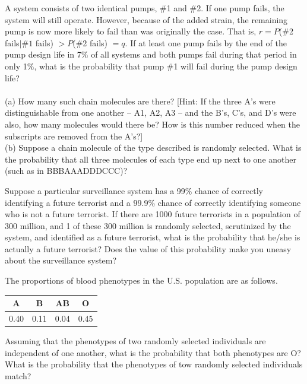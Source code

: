 \documentclass[12pt,letterpaper]{hmcpset}
\begin{document}
\begin{problem}[2.4.52]
A system consists of two identical pumps, $\#$1 and $\#$2. If one pump fails, the system will still operate. However, because of the added strain, the remaining pump is now more likely to fail than was originally the case. That is, $r = P$($\#$2 fails$|\#1$ fails) $> P$($\#$2 fails) $= q$. If at least one pump fails by the end of the pump design life in 7$\%$ of all systems and both pumps fail during that period in only 1$\%$, what is the probability that pump $\#$1 will fail during the pump design life?
\\ \\
(a) How many such chain molecules are there? [Hint: If the three A’s were distinguishable from one another – A1, A2, A3 – and the B’s, C’s, and D’s were also, how many molecules would there be? How is this number reduced when the subscripts are removed from the A’s?]
\\
(b) Suppose a chain molecule of the type described is randomly selected. What is the probability that all three molecules of each type end up next to one another (such as in BBBAAADDDCCC)?

\end{problem}

\begin{solution}

\end{solution}
\newpage

\begin{problem}[2.4.67]
Suppose a particular surveillance system has a 99$\%$ chance of correctly identifying a future terrorist and a 99.9$\%$ chance of correctly identifying someone who is not a future terrorist. If there are 1000 future terrorists in a population of 300 million, and 1 of these 300 million is randomly selected, scrutinized by the system, and identified as a future terrorist, what is the probability that he/she is actually a future terrorist? Does the value of this probability make you uneasy about the surveillance system?

\end{problem}

\begin{solution}

\end{solution}
\newpage

\begin{problem}[2.5.74]
The proportions of blood phenotypes in the U.S. population are as follows.\\
\begin{center}
	\begin{tabular}{c|c|c|c}
 		A & B & AB & O \\
 		\hline
 		0.40 & 0.11 & 0.04 & 0.45
	 \end{tabular}
\end{center}
Assuming that the phenotypes of two randomly selected individuals are independent of one another, what is the probability that both phenotypes are O? What is the probability that the phenotypes of tow randomly selected individuals match?
\end{problem}
\end{document}
